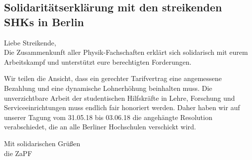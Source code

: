 
\subsection{Solidaritätserklärung	mit	den	streikenden	SHKs	in	Berlin}

Liebe	Streikende,\\
Die Zusammenkunft aller Physik-Fachschaften erklärt sich solidarisch mit eurem Arbeitskampf und unterstützt eure berechtigten Forderungen.

Wir	teilen	die	Ansicht,	dass	ein	gerechter	Tarifvertrag	eine	angemessene	Bezahlung	und	eine
dynamische	Lohnerhöhung	beinhalten	muss.	Die	unverzichtbare	Arbeit	der	studentischen
Hilfskräfte	in	Lehre,	Forschung	und	Serviceeinrichtungen	muss	endlich	fair honoriert	werden.
Daher	haben	wir	auf	unserer	Tagung	vom	31.05.18	bis	03.06.18	die	angehängte	Resolution
verabschiedet,	die	an	alle	Berliner	Hochschulen	verschickt	wird.

Mit	solidarischen Grüßen\\
die	ZaPF

